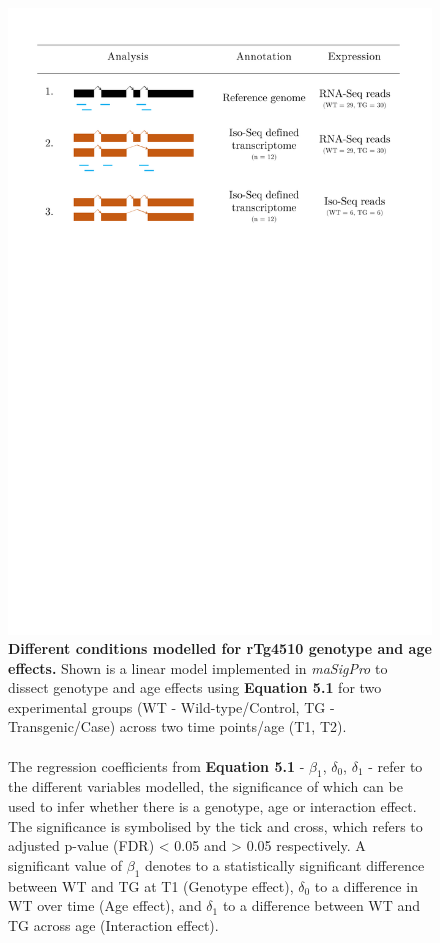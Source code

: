 \begin{figure}[!htp]
	\centering
	\includegraphics[page=2,trim={0 5cm 0 4cm},scale = 0.45]{Figures/Tg4510_diff_figures.pdf}
	\captionsetup{width=0.95\textwidth}
	\caption[Different conditions modelled for rTg4510 genotype and age effects]%
	{\textbf{Different conditions modelled for rTg4510 genotype and age effects.} Shown is a linear model implemented in \textit{maSigPro} to dissect genotype and age effects using \textbf{Equation 5.1} for two experimental groups (WT - Wild-type/Control, TG - Transgenic/Case) across two time points/age (T1, T2). 
	\\\\
	The regression coefficients from \textbf{Equation 5.1} - $\beta_{1}$, $\delta_{0}$, $\delta_{1}$ - refer to the different variables modelled, the significance of which can be used to infer whether there is a genotype, age or interaction effect. The significance is symbolised by the tick and cross, which refers to adjusted p-value (FDR) < 0.05 and > 0.05 respectively. A significant value of $\beta_{1}$ denotes to a statistically significant difference between WT and TG at T1 (Genotype effect), $\delta_{0}$ to a difference in WT over time (Age effect), and $\delta_{1}$ to a difference between WT and TG across age (Interaction effect).}   
	\label{fig:dea_model}
\end{figure}

